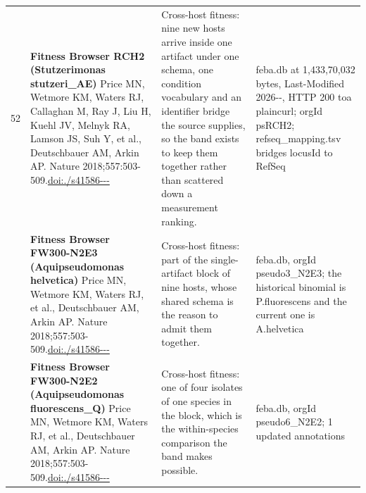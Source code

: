 \begin{landscape}
\begin{longtable}{@{}r@{\hspace{4pt}} L{78mm} L{72mm} L{76mm}@{}}
52 & \textbf{Fitness Browser RCH2 (Stutzerimonas stutzeri\_AE)} \newline Price MN, Wetmore KM, Waters RJ, Callaghan M, Ray J, Liu H, Kuehl JV, Melnyk RA, Lamson JS, Suh Y, et al., Deutschbauer AM, Arkin AP. Nature 2018;557:503-509.\newline \href{https://doi.org/10.1038/s41586-018-0124-0}{doi:./\allowbreak s41586---} & Cross-host fitness: nine new hosts arrive inside one artifact under one schema, one condition vocabulary and an identifier bridge the source supplies, so the band exists to keep them together rather than scattered down a measurement ranking. & feba.\allowbreak db at 1,433,70,032 by\allowbreak tes, Las\allowbreak t-\allowbreak Modifie\allowbreak d 2026--, HTT\allowbreak P 200 to\allowbreak  a plain\allowbreak  curl; o\allowbreak rgId psR\allowbreak CH2; ref\allowbreak seq\_\allowbreak mapping\allowbreak .\allowbreak tsv bri\allowbreak dges loc\allowbreak usId to \allowbreak RefSeq \\
 & \textbf{Fitness Browser FW300-N2E3 (Aquipseudomonas helvetica)} \newline Price MN, Wetmore KM, Waters RJ, et al., Deutschbauer AM, Arkin AP. Nature 2018;557:503-509.\newline \href{https://doi.org/10.1038/s41586-018-0124-0}{doi:./\allowbreak s41586---} & Cross-host fitness: part of the single-artifact block of nine hosts, whose shared schema is the reason to admit them together. & feba.\allowbreak db, org\allowbreak Id pseud\allowbreak o3\_\allowbreak N2E3; t\allowbreak he histo\allowbreak rical bi\allowbreak nomial i\allowbreak s P.\allowbreak  fluore\allowbreak scens an\allowbreak d the cu\allowbreak rrent on\allowbreak e is A.\allowbreak  helvet\allowbreak ica \\
 & \textbf{Fitness Browser FW300-N2E2 (Aquipseudomonas fluorescens\_Q)} \newline Price MN, Wetmore KM, Waters RJ, et al., Deutschbauer AM, Arkin AP. Nature 2018;557:503-509.\newline \href{https://doi.org/10.1038/s41586-018-0124-0}{doi:./\allowbreak s41586---} & Cross-host fitness: one of four isolates of one species in the block, which is the within-species comparison the band makes possible. & feba.\allowbreak db, org\allowbreak Id pseud\allowbreak o6\_\allowbreak N2E2; 1 updat\allowbreak ed annot\allowbreak ations \\

\end{longtable}
\end{landscape}
